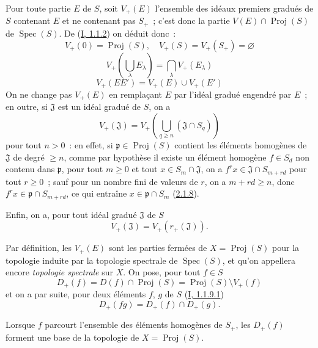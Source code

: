 \begin{env}[2.3.2]
\label{II.2.3.2-fr}
Pour toute partie $E$ de $S$, soit $V_+(E)$ l'ensemble des idéaux premiers
gradués de $S$ contenant $E$ et ne contenant pas $S_+$~; c'est donc la
partie $V(E)\cap\operatorname{Proj}(S)$ de
$\operatorname{Spec}(S)$. De (\hyperref[I.1.1.2-fr]{I, 1.1.2}) on déduit
donc~:
\[
  \label{II.2.3.2.1-fr}
  V_+(0)=\operatorname{Proj}(S),\quad
  V_+(S)=V_+(S_+)=\varnothing
  \tag{2.3.2.1}
\]
\[
  \label{II.2.3.2.2-fr}
  V_+\left(\bigcup_\lambda E_\lambda\right)
  =\bigcap_\lambda V_+(E_\lambda)
  \tag{2.3.2.2}
\]
\[
  \label{II.2.3.2.3-fr}
  V_+(EE')=V_+(E)\cup V_+(E')
  \tag{2.3.2.3}
\]
On ne change pas $V_+(E)$ en remplaçant $E$ par l'idéal gradué engendré par
$E$~; en outre, si $\mathfrak{J}$ est un idéal gradué de $S$, on a
\[
  \label{II.2.3.2.4-fr}
  V_+(\mathfrak{J})
  =V_+\left(\bigcup_{q\geq n}(\mathfrak{J}\cap S_q)\right)
  \tag{2.3.2.4}
\]
pour tout $n>0$~: en effet, si
$\mathfrak{p}\in\operatorname{Proj}(S)$ contient les éléments homogènes de
$\mathfrak{J}$ de degré $\geq n$, comme par hypothèse il existe un élément
homogène $f\in S_d$ non contenu dans $\mathfrak{p}$, pour tout $m\geq 0$ et
tout $x\in S_m\cap\mathfrak{J}$, on a
$f^r x\in\mathfrak{J}\cap S_{m+rd}$ pour tout $r\geq0$~; sauf pour un
nombre fini de valeurs de $r$, on a $m+rd\geq n$, donc
$f^r x\in\mathfrak{p}\cap S_{m+rd}$, ce qui entraîne
$x\in\mathfrak{p}\cap S_m$
(\hyperref[II.2.1.8-fr]{2.1.8}).

Enfin, on a, pour tout idéal gradué $\mathfrak{J}$ de $S$
\[
  \label{II.2.3.2.5-fr}
  V_+(\mathfrak{J})=V_+(r_+(\mathfrak{J})).
  \tag{2.3.2.5}
\]
\end{env}

\begin{env}[2.3.3]
\label{II.2.3.3-fr}
Par définition, les $V_+(E)$ sont les parties fermées de
$X=\operatorname{Proj}(S)$ pour la topologie induite par la topologie
spectrale de $\operatorname{Spec}(S)$, et qu'on appellera encore
\emph{topologie spectrale} sur $X$. On pose, pour tout $f\in S$
\[
  \label{II.2.3.3.1-fr}
  D_+(f)=D(f)\cap\operatorname{Proj}(S)
  =\operatorname{Proj}(S)\setminus V_+(f)
  \tag{2.3.3.1}
\]
et on a par suite, pour deux éléments $f$, $g$ de $S$
(\hyperref[I.1.1.9.1-fr]{I, 1.1.9.1})
\[
  \label{II.2.3.3.2-fr}
  D_+(fg)=D_+(f)\cap D_+(g).
  \tag{2.3.3.2}
\]
\end{env}

\begin{proposition}[2.3.4]
\label{II.2.3.4-fr}
Lorsque $f$ parcourt l'ensemble des éléments homogènes de $S_+$, les
$D_+(f)$ forment une base de la topologie de
$X=\operatorname{Proj}(S)$.
\end{proposition}

